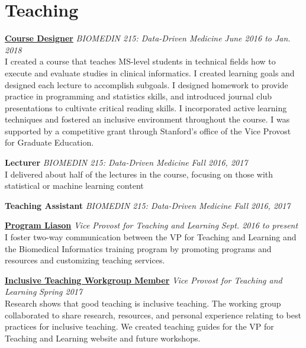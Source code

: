 
\section{\mysidestyle Teaching}

	\href{https://drive.google.com/file/d/1ot75uaaug10OrRX6AOHW08pIJS6d0eam/view?usp=sharing}
	{\textbf{Course Designer}}
	\textsl{BIOMEDIN 215: Data-Driven Medicine}
	\hfill \textsl{June 2016 to Jan. 2018} \\ 
    {\small I created a course that teaches MS-level students in technical fields how to execute and evaluate studies in clinical informatics. I created learning goals and designed each lecture to accomplish subgoals. I designed homework to provide practice in programming and statistics skills, and introduced journal club presentations to cultivate critical reading skills. I incorporated active learning techniques and fostered an inclusive environment throughout the course. I was supported by a competitive grant through Stanford's office of the Vice Provost for Graduate Education.} 

        	\textbf{Lecturer}  
	\textsl{BIOMEDIN 215: Data-Driven Medicine}
	\hfill \textsl{Fall 2016, 2017} \\ 
        {\small I delivered about half of the lectures in the course, focusing on those with statistical or machine learning content} 
        
        \textbf{Teaching Assistant} 
	\textsl{BIOMEDIN 215: Data-Driven Medicine}
        \hfill \textsl{Fall 2016, 2017} 

	\href{https://vptl.stanford.edu/students/graduate-students/ta-handbook/liaisons-consultants-and-mint-programs}
	{\textbf{Program Liason}}
        \textsl{Vice Provost for Teaching and Learning} 
 	\hfill \textsl{Sept. 2016 to present} \\ 
    {\small I foster two-way communication between the VP for Teaching and Learning and the Biomedical Informatics training program by promoting programs and resources and customizing teaching services.}
    
     \href{https://vptl.stanford.edu/faculty-staff-student-instructors/diversity-inclusion/resources/teaching-toolkits/identity-classroom}
     {\textbf{Inclusive Teaching Workgroup Member}}
     \textsl{Vice Provost for Teaching and Learning} 
     \hfill \textsl{Spring 2017} \\ 
    {\small Research shows that good teaching is inclusive teaching. The working group collaborated to share research, resources, and personal experience relating to best practices for inclusive teaching. We created teaching guides for the VP for Teaching and Learning website and future workshops.}
    

